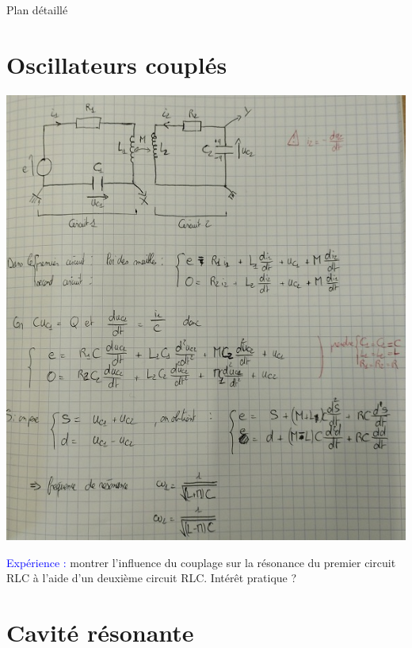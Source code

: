 \begin{reportBlock}{Plan détaillé}
  \section{Oscillateurs couplés}
\begin{center}
    \includegraphics[scale=0.5]{LP_Resonance/Oscillateurs_couple.jpg}
\end{center}    


\textcolor{blue}{Expérience : }montrer l'influence du couplage sur la résonance du premier circuit RLC à l'aide d'un deuxième circuit RLC. Intérêt pratique ?

\section{Cavité résonante}
\end{reportBlock}